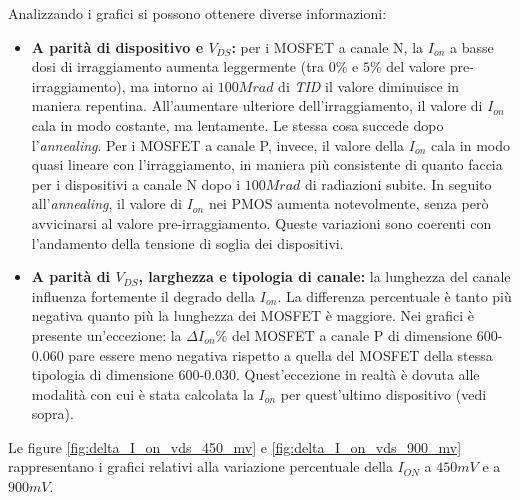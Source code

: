 Analizzando i grafici si possono ottenere diverse informazioni:
\begin{itemize}
    \item \textbf{A parità di dispositivo e $V_{DS}$:} per i MOSFET a canale N, la $I_{on}$ a basse dosi di irraggiamento aumenta leggermente (tra $0\%$ e $5\%$ del valore pre-irraggiamento), ma intorno ai $100 Mrad$ di \emph{TID} il valore diminuisce in maniera repentina. All'aumentare ulteriore dell'irraggiamento, il valore di $I_{on}$ cala in modo costante, ma lentamente. Le stessa cosa succede dopo l'\emph{annealing}. Per i MOSFET a canale P, invece, il valore della $I_{on}$ cala in modo quasi lineare con l'irraggiamento, in maniera più consistente di quanto faccia per i dispositivi a canale N dopo i $100 Mrad$ di radiazioni subite. In seguito all'\emph{annealing}, il valore di $I_{on}$ nei PMOS aumenta notevolmente, senza però avvicinarsi al valore pre-irraggiamento. Queste variazioni sono coerenti con l'andamento della tensione di soglia dei dispositivi.
	
	
    \item \textbf{A parità di $V_{DS}$, larghezza e tipologia di canale:} la lunghezza del canale influenza fortemente il degrado della $I_{on}$. La differenza percentuale è tanto più negativa quanto più la lunghezza dei MOSFET è maggiore. Nei grafici è presente un'eccezione: la $\Delta I_{on}\%$ del MOSFET a canale P di dimensione 600-0.060 pare essere meno negativa rispetto a quella del MOSFET della stessa tipologia di dimensione 600-0.030. Quest'eccezione in realtà è dovuta alle modalità con cui è stata calcolata la $I_{on}$ per quest'ultimo dispositivo (vedi sopra).

\end{itemize}

Le figure \ref{fig:delta_I_on_vds_450_mv} e \ref{fig:delta_I_on_vds_900_mv} rappresentano i grafici relativi alla variazione percentuale della $I_{ON}$ a $450mV$ e a $900mV$. 

\FloatBarrier


